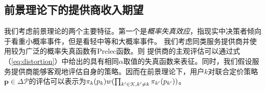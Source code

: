 \subsection{前景理论下的提供商收入期望}

我们考虑前景理论的两个主要特征。第一个是\emph{概率失真效应}，指现实中决策者倾向于看重小概率事件，但是看轻中等和大概率事件。
我们考虑同类服务提供商并使用较为广泛的概率失真函数有Prelec函数\cite{Prelec}。则
提供商的主观评估可以通过式（\ref{eq:distortion}）中给出的具有相同$\alpha$取值的失真函数来表征。同时，我们假设服务提供商能够客观地评估自身的策略。因而在前景理论下，用户$k$对联合定价策略$\mathbf{p}\in\Delta\mathcal{P}$的评估可以表示为$\pi_k(p_k)w(\prod_{k'\in\mathcal{K},k'\neq k}\pi_{k'}(p_{k'}))$。
